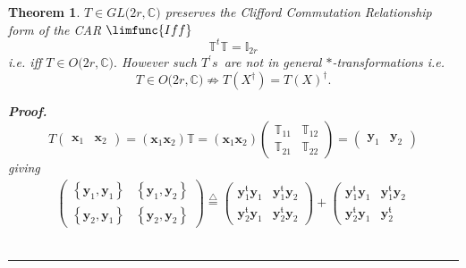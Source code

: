 \documentclass[aps,preprint]{revtex4}
\newtheorem{theorem}{Theorem}
\newenvironment{proof}[1][Proof]{\noindent\textbf{#1.} }{\ \rule{0.5em}{0.5em}}
\begin{document}
\begin{theorem}
$T\in GL(2r,\mathbb{C)}$ preserves the Clifford Commutation Relationship
form of the CAR $\limfunc{Iff}$ 
\begin{equation}
\mathbb{T}^{t}\mathbb{T=I}_{2r}
\end{equation}%
i.e. iff $T\in O(2r,\mathbb{C)}.$ \emph{However such }$T^{\prime }s$\emph{\
are not in general }$\ast $\emph{-transformations} i.e. 
\begin{equation}
T\in O(2r,\mathbb{C)}\nRightarrow T\left( X^{\dagger }\right) =T\left(
X\right) ^{\dagger }.
\end{equation}

\begin{proof}
\begin{equation}
T\left( 
\begin{array}{cc}
\mathbf{x}_{1} & \mathbf{x}_{2}%
\end{array}%
\right) =\left( \mathbf{x}_{1}\mathbf{x}_{2}\right) \mathbb{T}=\left( 
\mathbf{x}_{1}\mathbf{x}_{2}\right) \left( 
\begin{array}{cc}
\mathbb{T}_{11} & \mathbb{T}_{12} \\ 
\mathbb{T}_{21} & \mathbb{T}_{22}%
\end{array}%
\right) =\left( 
\begin{array}{cc}
\mathbf{y}_{1} & \mathbf{y}_{2}%
\end{array}%
\right)
\end{equation}%
giving 
\begin{gather}
\left( 
\begin{array}{cc}
\left\{ \mathbf{y}_{1},\mathbf{y}_{1}\right\} & \left\{ \mathbf{y}_{1},%
\mathbf{y}_{2}\right\} \\ 
\left\{ \mathbf{y}_{2},\mathbf{y}_{1}\right\} & \left\{ \mathbf{y}_{2},%
\mathbf{y}_{2}\right\}%
\end{array}%
\right) \overset{\triangle }{=}\left( 
\begin{array}{cc}
\mathbf{y}_{1}^{\mathfrak{t}}\mathbf{y}_{1} & \mathbf{y}_{1}^{\mathfrak{t}}%
\mathbf{y}_{2} \\ 
\mathbf{y}_{2}^{\mathfrak{t}}\mathbf{y}_{1} & \mathbf{y}_{2}^{\mathfrak{t}}%
\mathbf{y}_{2}%
\end{array}%
\right) +\left( 
\begin{array}{cc}
\mathbf{y}_{1}^{\mathfrak{t}}\mathbf{y}_{1} & \mathbf{y}_{1}^{\mathfrak{t}}%
\mathbf{y}_{2} \\ 
\mathbf{y}_{2}^{\mathfrak{t}}\mathbf{y}_{1} & \mathbf{y}_{2}^{\mathfrak{t}}%

\end{array}
\end{gather}
\end{proof}
\end{theorem}
\end{document}
